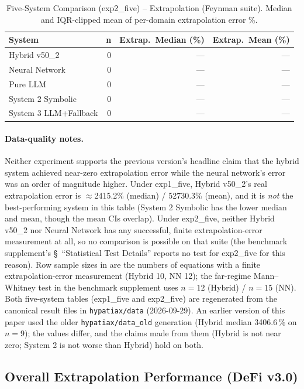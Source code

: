 \documentclass[twoside,11pt]{article}
\begin{document}
\begin{table}[t]
\centering
\caption{Five-System Comparison (exp2\_five) -- Extrapolation (Feynman
  suite). Median and IQR-clipped mean of per-domain extrapolation error \%.}
\label{tab:five_systems_extrapolation_exp2five}
\begin{tabular}{lrrr}
\toprule
\textbf{System} & \textbf{n}
  & \textbf{Extrap.\ Median (\%)} & \textbf{Extrap.\ Mean (\%)} \\
\midrule
Hybrid v50\_2 & 0 & --- & --- \\
Neural Network & 0 & --- & --- \\
Pure LLM & 0 & --- & --- \\
System 2 Symbolic & 0 & --- & --- \\
System 3 LLM+Fallback & 0 & --- & --- \\
\bottomrule
\end{tabular}
\end{table}

\paragraph{Data-quality notes.} Neither experiment supports the previous
version's headline claim that the hybrid system achieved near-zero
extrapolation error while the neural network's error was an order of
magnitude higher. Under exp1\_five, Hybrid v50\_2's real extrapolation
error is $\approx$2415.2\% (median) / 52730.3\% (mean), and it is
\emph{not} the best-performing system in this table (System 2 Symbolic has
the lower median and mean, though the mean CIs overlap). Under exp2\_five, neither Hybrid v50\_2 nor Neural
Network has any successful, finite extrapolation-error measurement at
all, so no comparison is possible on that suite (the benchmark
supplement's \S~``Statistical Test Details''
reports no test for exp2\_five for this reason). Row sample sizes in  are the numbers of equations
with a finite extrapolation-error measurement (Hybrid 10, NN 12); the
far-regime Mann--Whitney test in the benchmark supplement uses $n=12$ (Hybrid) /
$n=15$ (NN). Both five-system tables (exp1\_five and exp2\_five) are regenerated
from the canonical result files in \texttt{hypatiax/data} (2026-09-29). An earlier
version of this paper used the older \texttt{hypatiax/data\_old} generation
(Hybrid median 3406.6\,\% on $n=9$); the values differ, and the claims made from them
(Hybrid is not near zero; System 2 is not worse than Hybrid) hold on both.

\subsection{Overall Extrapolation Performance (DeFi v3.0)}\label{subsec:overall-extrapolation-performance-defi-v}
\label{sec:results_defi}
\end{document}
